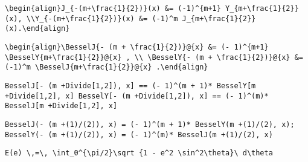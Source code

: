 \newsavebox\ABT
\begin{lrbox}{\ABT}
 \begin{minipage}[t]{0.82\textwidth}
  \lstinline[language={[latex]TeX},mathescape,breaklines=true]"\begin{align}J_{-(m+\frac{1}{2})}(x) &= (-1)^{m+1} Y_{m+\frac{1}{2}}(x), \\Y_{-(m+\frac{1}{2})}(x) &= (-1)^m J_{m+\frac{1}{2}}(x).\end{align}"
 \end{minipage}
\end{lrbox}
\newsavebox\ABST
\begin{lrbox}{\ABST}
 \begin{minipage}[t]{0.82\textwidth}
  \lstinline[language={[latex]TeX},mathescape,breaklines=true]"\begin{align}\BesselJ{- (m + \frac{1}{2})}@{x} &= (- 1)^{m+1} \BesselY{m+\frac{1}{2}}@{x} , \\ \BesselY{- (m + \frac{1}{2})}@{x} &= (-1)^m \BesselJ{m+\frac{1}{2}}@{x} .\end{align}"
 \end{minipage}
\end{lrbox}
\newsavebox\ABMM
\begin{lrbox}{\ABMM}
 \begin{minipage}[t]{0.82\textwidth}
  \lstinline[language={[latex]TeX},mathescape,breaklines=true]"BesselJ[- (m +Divide[1,2]), x] == (- 1)^(m + 1)* BesselY[m +Divide[1,2], x] BesselY[- (m +Divide[1,2]), x] == (- 1)^(m)* BesselJ[m +Divide[1,2], x]"
 \end{minipage}
\end{lrbox}
\newsavebox\ABMA
\begin{lrbox}{\ABMA}
 \begin{minipage}[t]{0.82\textwidth}
  \lstinline[language={[latex]TeX},mathescape,breaklines=true]"BesselJ(- (m +(1)/(2)), x) = (- 1)^(m + 1)* BesselY(m +(1)/(2), x); BesselY(- (m +(1)/(2)), x) = (- 1)^(m)* BesselJ(m +(1)/(2), x)"
 \end{minipage}
\end{lrbox}
\newsavebox\ACT
\begin{lrbox}{\ACT}
 \begin{minipage}[t]{0.82\textwidth}
  \lstinline[language={[latex]TeX},mathescape,breaklines=true]"E(e) \,=\, \int_0^{\pi/2}\sqrt {1 - e^2 \sin^2\theta}\ d\theta"
 \end{minipage}
\end{lrbox}
